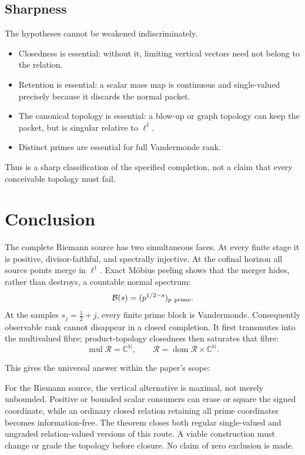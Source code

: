 \documentclass[11pt]{article}
\theoremstyle{definition}
\theoremstyle{remark}
\newcommand{\C}{\mathbb C}
\newcommand{\N}{\mathbb N}
\newcommand{\cR}{\mathcal R}
\newcommand{\cB}{\mathcal B}
\newcommand{\mul}{\operatorname{mul}}
\begin{document}
\subsection{Sharpness}

The hypotheses cannot be weakened indiscriminately.

\begin{itemize}[leftmargin=2em]
\item Closedness is essential: without it, limiting vertical vectors need
      not belong to the relation.
\item Retention is essential: a scalar mass map is continuous and
      single-valued precisely because it discards the normal packet.
\item The canonical topology is essential: a blow-up or graph topology can
      keep the packet, but is singular relative to \(\ell^1\).
\item Distinct primes are essential for full Vandermonde rank.
\end{itemize}

Thus  is a sharp classification of the specified completion,
not a claim that every conceivable topology must fail.

\section{Conclusion}

The complete Riemann source has two simultaneous faces.  At every finite
stage it is positive, divisor-faithful, and spectrally injective.  At the
cofinal horizon all source points merge in \(\ell^1\).  Exact M\"obius peeling
shows that the merger hides, rather than destroys, a countable normal
spectrum:
\[
                         \cB(s)=(p^{1/2-s})_{p\ {\rm prime}}.
\]
At the samples \(s_j=\tfrac12+j\), every finite prime block is
Vandermonde.  Consequently observable rank cannot disappear in a closed
completion.  It first transmutes into the multivalued fibre; product-topology
closedness then saturates that fibre:
\[
              \mul\cR=\C^\N,\qquad
              \cR=\operatorname{dom}\cR\times\C^\N.
\]

This gives the universal answer within the paper's scope:
\begin{center}
\end{center}
For the Riemann source, the vertical alternative is maximal, not merely
unbounded.  Positive or bounded scalar consumers can erase or square the
signed coordinate, while an ordinary closed relation retaining all prime
coordinates becomes information-free.  The theorem closes both regular
single-valued and ungraded relation-valued versions of this route.  A viable
construction must change or grade the topology before closure.  No claim of
zero exclusion is made.
\end{document}
